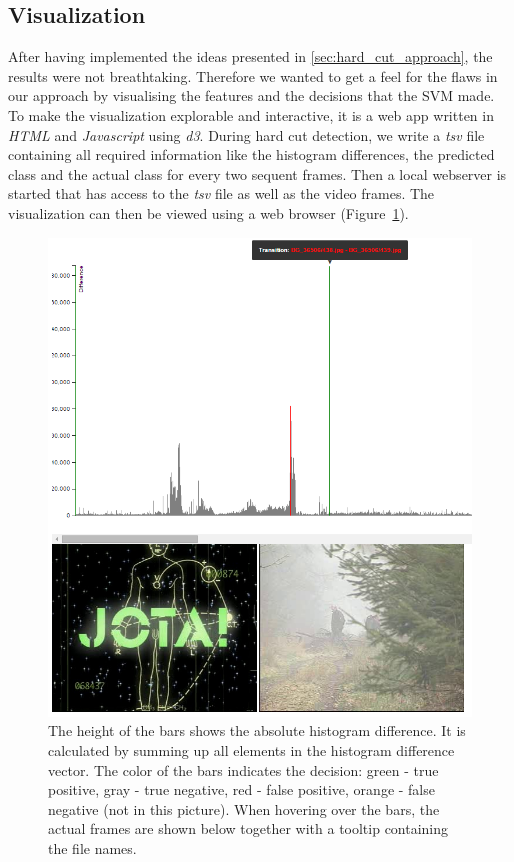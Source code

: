 \subsection{Visualization}
\label{sec:hard_cut_visualization}

After having implemented the ideas presented in \ref{sec:hard_cut_approach}, the results were not breathtaking. 
Therefore we wanted to get a feel for the flaws in our approach by visualising the features and the decisions that the SVM made.
To make the visualization explorable and interactive, it is a web app written in \emph{HTML} and \emph{Javascript} using \emph{d3}.
During hard cut detection, we write a \emph{tsv} file containing all required information like the histogram differences, the predicted class and the actual class for every two sequent frames.
Then a local webserver is started that has access to the \emph{tsv} file as well as the video frames.
The visualization can then be viewed using a web browser (Figure~\ref{fig:hard_cut_visualization}).

\begin{figure}
	\centering
	\includegraphics[scale=.7]{images/hard_cut_visualization.png}
	\caption{The height of the bars shows the absolute histogram difference. It is calculated by summing up all elements in the histogram difference vector. The color of the bars indicates the decision: green - true positive, gray - true negative, red - false positive, orange - false negative (not in this picture). When hovering over the bars, the actual frames are shown below together with a tooltip containing the file names.}
	\label{fig:hard_cut_visualization}
\end{figure}


